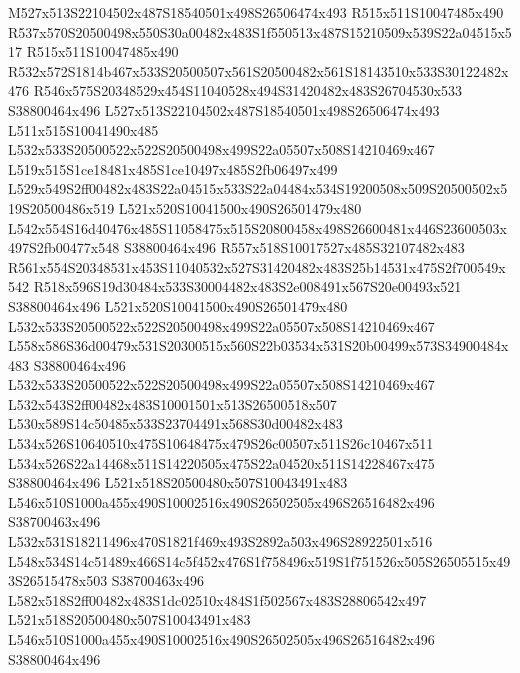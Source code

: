 \documentclass{article}
\begin{document}
\begin{multicols}{2}
M527x513S22104502x487S18540501x498S26506474x493 R515x511S10047485x490 R537x570S20500498x550S30a00482x483S1f550513x487S15210509x539S22a04515x517 R515x511S10047485x490 R532x572S1814b467x533S20500507x561S20500482x561S18143510x533S30122482x476 R546x575S20348529x454S11040528x494S31420482x483S26704530x533 S38800464x496 L527x513S22104502x487S18540501x498S26506474x493 L511x515S10041490x485 L532x533S20500522x522S20500498x499S22a05507x508S14210469x467 L519x515S1ce18481x485S1ce10497x485S2fb06497x499 L529x549S2ff00482x483S22a04515x533S22a04484x534S19200508x509S20500502x519S20500486x519 L521x520S10041500x490S26501479x480 L542x554S16d40476x485S11058475x515S20800458x498S26600481x446S23600503x497S2fb00477x548 S38800464x496 R557x518S10017527x485S32107482x483 R561x554S20348531x453S11040532x527S31420482x483S25b14531x475S2f700549x542 R518x596S19d30484x533S30004482x483S2e008491x567S20e00493x521 S38800464x496 L521x520S10041500x490S26501479x480 L532x533S20500522x522S20500498x499S22a05507x508S14210469x467 L558x586S36d00479x531S20300515x560S22b03534x531S20b00499x573S34900484x483 S38800464x496 L532x533S20500522x522S20500498x499S22a05507x508S14210469x467 L532x543S2ff00482x483S10001501x513S26500518x507 L530x589S14c50485x533S23704491x568S30d00482x483 L534x526S10640510x475S10648475x479S26c00507x511S26c10467x511 L534x526S22a14468x511S14220505x475S22a04520x511S14228467x475 S38800464x496 L521x518S20500480x507S10043491x483 L546x510S1000a455x490S10002516x490S26502505x496S26516482x496 S38700463x496 L532x531S18211496x470S1821f469x493S2892a503x496S28922501x516 L548x534S14c51489x466S14c5f452x476S1f758496x519S1f751526x505S26505515x493S26515478x503 S38700463x496 L582x518S2ff00482x483S1dc02510x484S1f502567x483S28806542x497 L521x518S20500480x507S10043491x483 L546x510S1000a455x490S10002516x490S26502505x496S26516482x496 S38800464x496





\end{multicols}
\end{document}
